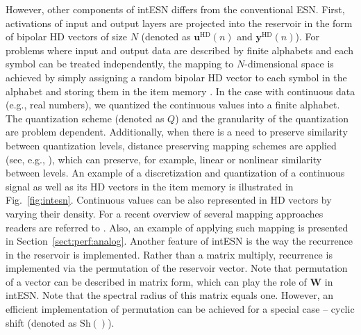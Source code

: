 However, other components of intESN differs from the conventional ESN.  First,
activations of input and output layers are projected into the  reservoir in the
form of bipolar HD vectors \cite{MAP} of size $N$  (denoted as
$\textbf{u}^{\text{HD}}(n)$ and $\textbf{y}^{\text{HD}}(n)$). 
For problems where input and output data are described by finite
alphabets and each symbol can be treated independently,  the mapping to $N$-dimensional space is achieved by simply assigning a random bipolar HD vector
to each symbol in the alphabet and storing them in the item memory \cite{Kanerva09, Kleyko2015}.  In the
case with continuous data (e.g., real numbers), we quantized the continuous values
into a finite alphabet.
The quantization scheme (denoted as $Q$) and the granularity of the
quantization are problem dependent. Additionally, when there is a need to
preserve similarity between quantization levels, distance preserving mapping
schemes are applied (see, e.g., \cite{Scalarencoding, Widdows15}), which can
preserve, for example, linear or nonlinear similarity between levels. An example
of a discretization and quantization of a continuous signal as well as its
HD vectors in the item memory is illustrated in Fig.~\ref{fig:intesn}. 
Continuous values can be also represented in HD vectors by varying their density. For a recent overview of several mapping approaches readers are referred to \cite{TNNLS18}. Also, an example of applying such mapping is presented in Section~\ref{sect:perf:analog}.
Another feature of intESN is the way the recurrence in the reservoir is implemented. Rather than a matrix multiply, recurrence is implemented via the permutation of the reservoir vector. Note that permutation of a vector can be described in matrix form, which can play the role of $\textbf{W}$ in intESN. Note that the spectral radius of this matrix equals one.
However, an efficient implementation of permutation can be achieved for a special case -- cyclic shift (denoted as $\text{Sh}()$). 

